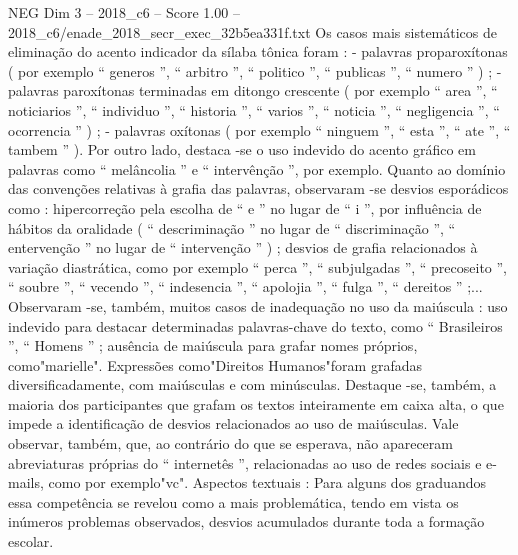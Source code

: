 \begin{textsample}{NEG Dim 3 – 2018\_c6 – Score 1.00 – 2018\_c6/enade\_2018\_secr\_exec\_32b5ea331f.txt}
Os casos mais sistemáticos de eliminação do acento indicador da sílaba tônica foram : - palavras proparoxítonas ( por exemplo “ generos ”, “ arbitro ”, “ politico ”, “ publicas ”, “ numero ” ) ; - palavras paroxítonas terminadas em ditongo crescente ( por exemplo “ area ”, “ noticiarios ”, “ individuo ”, “ historia ”, “ varios ”, “ noticia ”, “ negligencia ”, “ ocorrencia ” ) ; - palavras oxítonas ( por exemplo “ ninguem ”, “ esta ”, “ ate ”, “ tambem ” ).
Por outro lado, destaca -se o uso indevido do acento gráfico em palavras como “ melâncolia ” e “ intervênção ”, por exemplo.
Quanto ao domínio das convenções relativas à grafia das palavras, observaram -se desvios esporádicos como : hipercorreção pela escolha de “ e ” no lugar de “ i ”, por influência de hábitos da oralidade ( “ descriminação ” no lugar de “ discriminação ”, “ entervenção ” no lugar de “ intervenção ” ) ; desvios de grafia relacionados à variação diastrática, como por exemplo “ perca ”, “ subjulgadas ”, “ precoseito ”, “ soubre ”, “ vecendo ”, “ indesencia ”, “ apolojia ”, “ fulga ”, “ dereitos ” ;...
Observaram -se, também, muitos casos de inadequação no uso da maiúscula : uso indevido para destacar determinadas palavras-chave do texto, como “ Brasileiros ”, “ Homens ” ; ausência de maiúscula para grafar nomes próprios, como"marielle".
Expressões como"Direitos Humanos"foram grafadas diversificadamente, com maiúsculas e com minúsculas.
Destaque -se, também, a maioria dos participantes que grafam os textos inteiramente em caixa alta, o que impede a identificação de desvios relacionados ao uso de maiúsculas.
Vale observar, também, que, ao contrário do que se esperava, não apareceram abreviaturas próprias do “ internetês ”, relacionadas ao uso de redes sociais e e-mails, como por exemplo"vc".
Aspectos textuais : Para alguns dos graduandos essa competência se revelou como a mais problemática, tendo em vista os inúmeros problemas observados, desvios acumulados durante toda a formação escolar.

\end{textsample}
